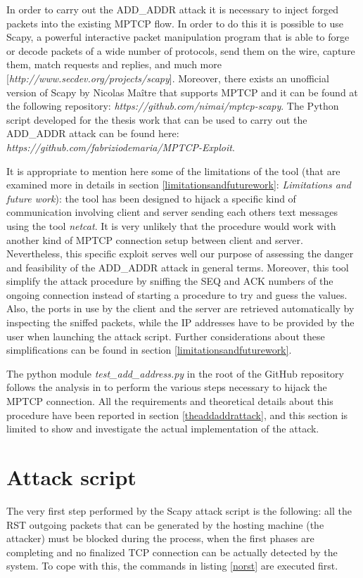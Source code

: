 In order to carry out the ADD\_ADDR attack it is necessary to inject forged packets into the existing MPTCP flow. In order to do this it is possible to use Scapy, a powerful interactive packet manipulation program that is able to forge or decode packets of a wide number of protocols, send them on the wire, capture them, match requests and replies, and much more [\textit{http://www.secdev.org/projects/scapy}]. Moreover, there exists an unofficial version of Scapy by Nicolas Maître that supports MPTCP and it can be found at the following repository: \textit{https://github.com/nimai/mptcp-scapy}. The Python script developed for the thesis work that can be used to carry out the ADD\_ADDR attack can be found here: \textit{https://github.com/fabriziodemaria/MPTCP-Exploit}. 

It is appropriate to mention here some of the limitations of the tool (that are examined more in details in section \ref{limitationsandfuturework}: \textit{Limitations and future work}): the tool has been designed to hijack a specific kind of communication involving client and server sending each others text messages using the tool \textit{netcat}. It is very unlikely that the procedure would work with another kind of MPTCP connection setup between client and server. Nevertheless, this specific exploit serves well our purpose of assessing the danger and feasibility of the ADD\_ADDR attack in general terms.
Moreover, this tool simplify the attack procedure by sniffing the SEQ and ACK numbers of the ongoing connection instead of starting a procedure to try and guess the values. Also, the ports in use by the client and the server are retrieved automatically by inspecting the sniffed packets, while the IP addresses have to be provided by the user when launching the attack script. Further considerations about these simplifications can be found in section \ref{limitationsandfuturework}.

The python module \textit{test\_add\_address.py} in the root of the GitHub repository follows the analysis in  to perform the various steps necessary to hijack the MPTCP connection. All the requirements and theoretical details about this procedure have been reported in section \ref{theaddaddrattack}, and this section is limited to show and investigate the actual implementation of the attack.

\section{Attack script}
The very first step performed by the Scapy attack script is the following: all the RST outgoing packets that can be generated by the hosting machine (the attacker) must be blocked during the process, when the first phases are completing and no finalized TCP connection can be actually detected by the system. To cope with this, the commands in listing \ref{norst} are executed first.


